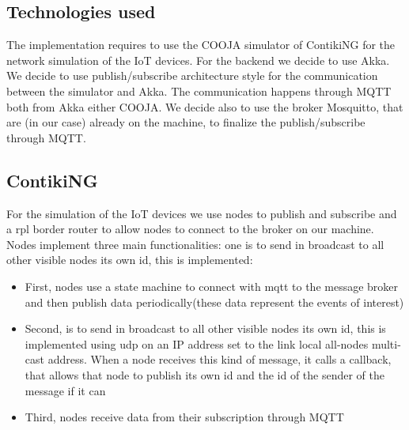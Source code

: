 \documentclass[10pt]{article}
\begin{document}
	\subsection{Technologies used}
	The implementation requires to use the COOJA simulator of ContikiNG for the network simulation of the IoT devices. For the backend we decide to use Akka. We decide to use publish/subscribe architecture style for the communication between the simulator and Akka. The communication happens through MQTT both from Akka either COOJA. We decide also to use the broker Mosquitto, that are (in our case) already on the machine, to finalize the publish/subscribe through MQTT.
	
	\subsection{ContikiNG}
	For the simulation of the IoT devices we use nodes to publish and subscribe and a rpl border router to allow nodes to connect to the broker on our machine. Nodes implement three main functionalities:
	one is to send in broadcast to all other visible nodes its own id, this is implemented:
	
	\begin{itemize}
		\item 	First,  nodes use a state machine to connect with mqtt to the message broker and then publish data periodically(these data represent the events of interest)      
		\item   Second,	 is to send in broadcast to all other visible nodes its own id, this is implemented using udp on an IP address set to the link local all-nodes multi-cast address. When a node receives this kind of message, it calls a callback, that allows that node to publish its own id and the id of the sender of the message if it can
		\item	Third, nodes receive data from their subscription through MQTT	
	\end{itemize}
	
\end{document}
